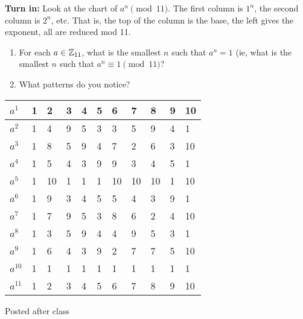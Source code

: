\documentclass[letterpaper, 11 pt]{article}
\begin{document}
{\bf Turn in:}
 Look at the chart of $a^n \pmod{11}$. The first column is $1^n$, the second column is $2^n$, etc. That is, the top of the column is the base, the left gives the exponent, all are reduced mod 11.
 
\begin{enumerate}
 \item  For each $a\in\mathbb Z_{11}$, what is the smallest $n$ such that $a^n= 1$ (ie, what is the smallest $n$ such that $a^n\equiv 1 \pmod{11}$?
 
\item  What patterns do you notice?
\end{enumerate}
\begin{tabular}{|l||l|l|l|l|l|l|l|l|l|l|}\hline%
$a^1$  & 1 & 2  & 3 & 4 & 5 & 6  & 7  & 8  & 9 & 10  \\ \hline\hline
$a^2 $ & 1 & 4  & 9 & 5 & 3 & 3  & 5  & 9  & 4 & 1   \\\hline
$a^3 $ & 1 & 8  & 5 & 9 & 4 & 7  & 2  & 6  & 3 & 10  \\\hline
$a^4 $ & 1 & 5  & 4 & 3 & 9 & 9  & 3  & 4  & 5 & 1   \\\hline
$a^5 $ & 1 & 10 & 1 & 1 & 1 & 10 & 10 & 10 & 1 & 10  \\\hline
$a^6 $ & 1 & 9  & 3 & 4 & 5 & 5  & 4  & 3  & 9 & 1   \\\hline
$a^7 $ & 1 & 7  & 9 & 5 & 3 & 8  & 6  & 2  & 4 & 10  \\\hline
$a^8 $ & 1 & 3  & 5 & 9 & 4 & 4  & 9  & 5  & 3 & 1   \\\hline
$a^9 $ & 1 & 6  & 4 & 3 & 9 & 2  & 7  & 7  & 5 & 10  \\\hline
$a^{10}$ & 1 & 1  & 1 & 1 & 1 & 1  & 1  & 1  & 1 & 1   \\\hline
$a^{11}$ & 1 & 2  & 3 & 4 & 5 & 6  & 7  & 8  & 9 & 10 \\\hline
\end{tabular}
\begin{solution}
 Posted after class
\end{solution}
\end{document}
